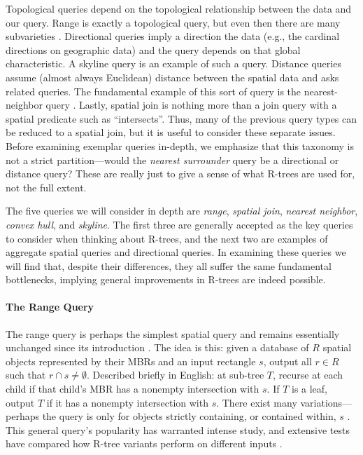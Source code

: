 Topological queries depend on the topological relationship between the data and our query.
Range is exactly a topological query, but even then there are many subvarieties \cite{papadiassellistheodoridisegenhofer95,gaedegunther98}.
Directional queries imply a direction the data (e.g., the cardinal directions on geographic data) and the query depends on that global characteristic.
A skyline query \cite{papadiastaofuseeger05} is an example of such a query.
Distance queries assume (almost always Euclidean) distance between the spatial data and asks related queries.
The fundamental example of this sort of query is the nearest-neighbor query \cite{roussopouloskelleyvincent95}.
Lastly, spatial join is nothing more than a join query with a spatial predicate \cite{brinkhoffkriegelseeger93} such as ``intersects''.
Thus, many of the previous query types can be reduced to a spatial join, but it is useful to consider these separate issues.
Before examining exemplar queries in-depth, we emphasize that this taxonomy is not a strict partition---would the \emph{nearest surrounder} query \cite{leeleeleong10} be a directional or distance query?
These are really just to give a sense of what R-trees are used for, not the full extent.

The five queries we will consider in depth are \emph{range}, \emph{spatial join}, \emph{nearest neighbor}, \emph{convex hull}, and \emph{skyline}.
The first three are generally accepted as the key queries to consider when thinking about R-trees, and the next two are examples of aggregate spatial queries and directional queries.
In examining these queries we will find that, despite their differences, they all suffer the same fundamental bottlenecks, implying general improvements in R-trees are indeed possible.

\paragraph{The Range Query}
The range query is perhaps the simplest spatial query and remains essentially unchanged since its introduction \cite{guttman84}.
The idea is this: given a database of $R$ spatial objects represented by their MBRs and an input rectangle $s$, output all $r\in R$ such that $r\cap s\neq\emptyset$.
Described briefly in English: at sub-tree $T$, recurse at each child if that child's MBR has a nonempty intersection with $s$.
If $T$ is a leaf, output $T$ if it has a nonempty intersection with $s$.
There exist many variations---perhaps the query is only for objects strictly containing, or contained within, $s$ \cite{gaedegunther98}.
This general query's popularity has warranted intense study, and extensive tests have compared how R-tree variants perform on different inputs \cite{papadiassellistheodoridisegenhofer95}.

